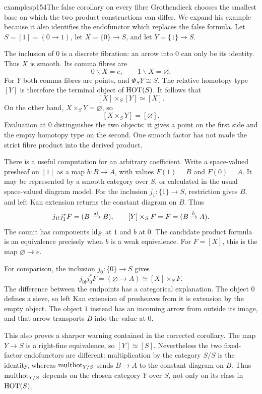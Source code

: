 \begin{dcomment}{examples}{p154}{The false corollary on every fibre}
Grothendieck chooses the smallest base on which the two product constructions can differ. We expand his example because it also identifies the endofunctor which replaces the false formula. Let $S=[1]=(0\longrightarrow1)$, let $X=\{0\}\longrightarrow S$, and let $Y=\{1\}\longrightarrow S$.

The inclusion of $0$ is a discrete fibration: an arrow into $0$ can only be its identity. Thus $X$ is smooth. Its comma fibres are
\[
 0\backslash X=e,\qquad1\backslash X=\varnothing.
\]
For $Y$ both comma fibres are points, and $\Phi_SY\cong S$. The relative homotopy type $[Y]$ is therefore the terminal object of $\mathrm{HOT}(S)$. It follows that
\[
 [X]\times_S[Y]\simeq[X].
\]
On the other hand, $X\times_SY=\varnothing$, so
\[
 [X\times_SY]=[\varnothing].
\]
Evaluation at $0$ distinguishes the two objects: it gives a point on the first side and the empty homotopy type on the second. One smooth factor has not made the strict fibre product into the derived product.

There is a useful computation for an arbitrary coefficient. Write a space-valued presheaf on $[1]$ as a map $b:B\longrightarrow A$, with values $F(1)=B$ and $F(0)=A$. It may be represented by a smooth category over $S$, or calculated in the usual space-valued diagram model. For the inclusion $j_1:\{1\}\longrightarrow S$, restriction gives $B$, and left Kan extension returns the constant diagram on $B$. Thus
\[
 j_{1!}j_1^*F=(B\xrightarrow{\mathrm{id}}B),
 \qquad [Y]\times_SF=F=(B\xrightarrow{b}A).
\]
The counit has components $\mathrm{id}_B$ at $1$ and $b$ at $0$. The candidate product formula is an equivalence precisely when $b$ is a weak equivalence. For $F=[X]$, this is the map $\varnothing\longrightarrow e$.

For comparison, the inclusion $j_0:\{0\}\longrightarrow S$ gives
\[
 j_{0!}j_0^*F=(\varnothing\longrightarrow A)
 \simeq[X]\times_SF.
\]
The difference between the endpoints has a categorical explanation. The object $0$ defines a sieve, so left Kan extension of presheaves from it is extension by the empty object. The object $1$ instead has an incoming arrow from outside its image, and that arrow transports $B$ into the value at $0$.

This also proves a sharper warning contained in the corrected corollary. The map $Y\longrightarrow S$ is a right-fine equivalence, so $[Y]\simeq[S]$. Nevertheless the two fixed-factor endofunctors are different: multiplication by the category $S/S$ is the identity, whereas $\mathrm{multhot}_{Y/S}$ sends $B\longrightarrow A$ to the constant diagram on $B$. Thus $\mathrm{multhot}_{Y/S}$ depends on the chosen category $Y$ over $S$, not only on its class in $\mathrm{HOT}(S)$.
\end{dcomment}


